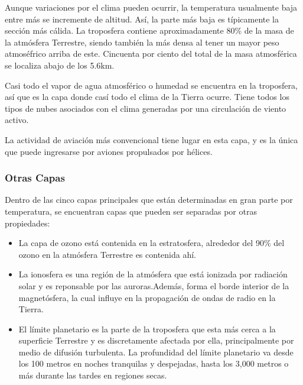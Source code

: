 \documentclass{article} %
\begin{document}
     Aunque variaciones por el clima pueden ocurrir, la temperatura usualmente baja entre más se incremente de altitud. Así, la parte más baja es típicamente la sección más cálida. La troposfera contiene aproximadamente 80\% de la masa de la atmósfera Terrestre, siendo también la más densa al tener un mayor peso atmoséfrico arriba de este. Cincuenta por ciento del total de la masa atmosférica se localiza abajo de los 5.6km.
     
     Casi todo el vapor de agua atmosférico o humedad se encuentra en la troposfera, así que es la capa donde casí todo el clima de la Tierra ocurre. Tiene todos los tipos de nubes asociados con el clima generadas por una circulación de viento activo. 
     
     La actividad de aviación más convencional tiene lugar en esta capa, y es la única que puede ingresarse por aviones propulsados por hélices.
     
     \subsubsection{Otras Capas}
     Dentro de las cinco capas principales que están determinadas en gran parte por temperatura, se encuentran capas que pueden ser separadas por otras propiedades:
     
\begin{itemize}
\item La capa de ozono está contenida en la estratosfera, alrededor del 90\% del ozono en la atmósfera Terrestre es contenida ahí. 
\item La ionosfera es una región de la atmósfera que está ionizada por radiación solar y es reponsable por las auroras.Además, forma el borde interior de la magnetósfera, la cual influye en la propagación de ondas de radio en la Tierra. 
\item El límite planetario es la parte de la troposfera que esta más cerca a la superficie Terrestre y es discretamente afectada por ella, principalmente por medio de difusión turbulenta. La profundidad del límite planetario va desde los 100 metros en noches tranquilas y despejadas, hasta los 3,000 metros o más durante las tardes en regiones secas.
\end{itemize}

\end{document}
